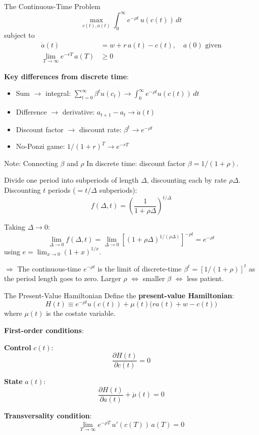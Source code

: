 \documentclass[blue]{beamer}
\begin{document}
\begin{frame}{The Continuous-Time Problem}
	\[
	\max_{c(t), a(t)} \int_0^\infty e^{-\rho t}\, u(c(t))\, dt
	\]
	subject to
	\begin{align*}
		\dot{a}(t) &= w + r\, a(t) - c(t), \quad a(0) \text{ given} \\
		\lim_{T\to\infty} e^{-rT}\, a(T) &\geq 0
	\end{align*}
	
	\textbf{Key differences from discrete time}:
	\begin{itemize}
		\item Sum $\to$ integral: $\sum_{t=0}^\infty \beta^t u(c_t) \to \int_0^\infty e^{-\rho t} u(c(t))\, dt$
		\item Difference $\to$ derivative: $a_{t+1} - a_t \to \dot{a}(t)$
		\item Discount factor $\to$ discount rate: $\beta^t \to e^{-\rho t}$
		\item No-Ponzi game: $1/(1+r)^T \to e^{-rT}$
	\end{itemize}
\end{frame}


\begin{frame}{Note: Connecting $\beta$ and $\rho$}
	In discrete time: discount factor $\beta = 1/(1+\rho)$.
	
	\bigskip
	Divide one period into subperiods of length $\Delta$, discounting each by rate $\rho\Delta$. Discounting $t$ periods ($= t/\Delta$ subperiods):
	\[
	f(\Delta, t) = \left(\frac{1}{1+\rho\Delta}\right)^{t/\Delta}
	\]
	
	Taking $\Delta \to 0$:
	\[
	\lim_{\Delta\to 0} f(\Delta, t) = \lim_{\Delta\to 0} \left[(1+\rho\Delta)^{1/(\rho\Delta)}\right]^{-\rho t} = e^{-\rho t}
	\]
	using $e = \lim_{x\to 0}(1+x)^{1/x}$.
	
	\bigskip
	$\Rightarrow$ The continuous-time $e^{-\rho t}$ is the limit of discrete-time $\beta^t = [1/(1+\rho)]^t$ as the period length goes to zero. Larger $\rho$ $\Leftrightarrow$ smaller $\beta$ $\Leftrightarrow$ less patient.
\end{frame}


\begin{frame}{The Present-Value Hamiltonian}
	Define the \textbf{present-value Hamiltonian}:
	\[
	H(t) \equiv e^{-\rho t}u(c(t)) + \mu(t)\bigl(r a(t) + w - c(t)\bigr)
	\]
	where $\mu(t)$ is the costate variable.
	
	\bigskip
	\textbf{First-order conditions}:
	
	\textbf{Control} $c(t)$:
	\[
	\frac{\partial H(t)}{\partial c(t)} = 0
	\]
	
	\textbf{State} $a(t)$:
	\[
	\frac{\partial H(t)}{\partial a(t)} + \dot{\mu}(t) = 0
	\]
	
	\textbf{Transversality condition}:
	\[
	\lim_{T\to\infty} e^{-\rho T}\, u'(c(T))\, a(T) = 0
	\]
\end{frame}
\end{document}
